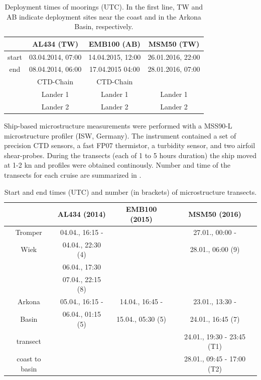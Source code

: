  \begin{table}
\caption{Deployment times of moorings (UTC). In the first 
line, TW and AB indicate deployment sites near the coast and in the Arkona 
Basin, respectively.}\label{deployments}
\begin{center}
\begin{tabular}{cccc}
 & AL434 (TW) & EMB100 (AB) & MSM50 (TW) \\
 \hline
 start & 03.04.2014, 07:00 & 14.04.2015, 12:00 & 26.01.2016, 22:00 \\ 
 end & 08.04.2014, 06:00 & 17.04.2015 04:00 & 28.01.2016, 07:00 \\
\hline
 & CTD-Chain & CTD-Chain & \\
 & Lander 1 & Lander 1 & Lander 1\\
 & Lander 2 & Lander 2 & Lander 2\\
\end{tabular}
\end{center}
\end{table}

Ship-based microstructure measurements were performed with a MSS90-L 
microstructure profiler (ISW, Germany). The instrument contained a set of 
precision CTD sensors, a fast FP07 thermistor, a turbidity sensor, and two 
airfoil shear-probes. During the transects (each of 1 to 5 hours duration) the 
ship moved at 1-2 kn and profiles were obtained continously. Number and time of 
the transects for each cruise are summarized in .

 \begin{table}
\caption{Start and end times (UTC) and number (in brackets) of microstructure 
transects.}\label{mss}
\begin{center}
\begin{tabular}{cccc}
 & AL434 (2014) & EMB100 (2015) & MSM50 (2016)\\
 \hline
Tromper & 04.04., 16:15 - & & 27.01., 00:00 - \\ 
Wiek & 04.04., 22:30 (4) & & 28.01., 06:00 (9)\\
 & 06.04., 17:30 & & \\
 &  07.04., 22:15 (8) & & \\
\hline
Arkona & 05.04., 16:15 - & 14.04., 16:45 - & 23.01., 13:30 - \\
Basin & 06.04., 01:15 (5) & 15.04., 05:30 (5) & 24.01., 16:45 (7)\\
\hline
transect &  & & 24.01., 19:30 - 23:45 (T1)\\
coast to basin & & & 28.01., 09:45 - 17:00 (T2)\\
\end{tabular}
\end{center}
\end{table}

